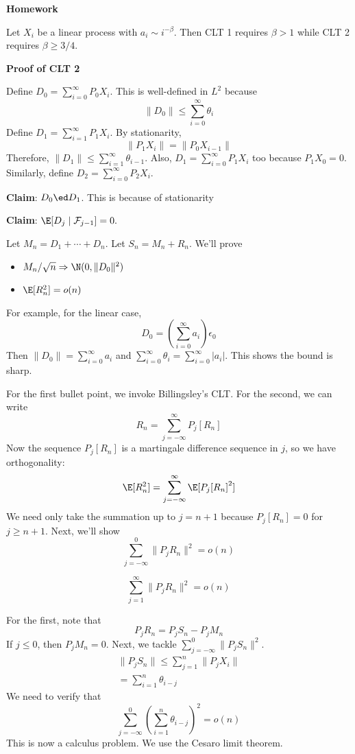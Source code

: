 \textbf{Homework}

Let \(X_i\) be a linear process with \(a_i \sim i^{-\beta}\). Then CLT 1 requires \(\beta > 1\) while CLT 2 requires \(\beta \geq 3/4\).

\textbf{Proof of CLT 2}

Define \(D_0 = \sum_{i=0}^\infty P_0 X_i\). This is well-defined in \(L^2\) because
\[\|D_0\| \leq \sum_{i=0}^\infty \theta_i\]
Define \(D_1 = \sum_{i=1}^\infty P_1 X_i\). By stationarity,
\[\|P_1 X_i\| = \|P_0 X_{i-1}\|\]
Therefore, \(\|D_1\| \leq \sum_{i=1}^\infty \theta_{i-1}\). Also, \(D_1 = \sum_{i=0}^\infty P_1 X_i\) too because \(P_1 X_0 = 0\). Similarly, define \(D_2 = \sum_{i=0}^\infty P_2 X_i\).

\textbf{Claim}: \(D_0 \ed D_1\). This is because of stationarity

\textbf{Claim}: \(\E[D_j \mid \mathcal{F}_{j-1}] = 0.\)

Let \(M_n = D_1 + \cdots + D_n\). Let \(S_n = M_n + R_n\). We'll prove

\begin{itemize}
\tightlist
\item
  \(M_n/\sqrt{n} \Rightarrow \N(0, \|D_0\|^2)\)
\item
  \(\E[R_n^2] = o(n)\)
\end{itemize}

For example, for the linear case,
\[D_0 = \left( \sum_{i=0}^\infty a_i \right) \epsilon_0\]
Then \(\|D_0\| = \sum_{i=0}^\infty a_i\) and \(\sum_{i=0}^\infty \theta_i = \sum_{i=0}^\infty |a_i|\). This shows the bound is sharp.

For the first bullet point, we invoke Billingsley's CLT. For the second, we can write
\[R_n = \sum_{j=-\infty}^\infty P_j[R_n]\]
Now the sequence \(P_j[R_n]\) is a martingale difference sequence in \(j\), so we have orthogonality:
\[\E[R_n^2] = \sum_{j=-\infty}^\infty \E[P_j[R_n]^2]\]
We need only take the summation up to \(j = n+1\) because \(P_j[R_n] = 0\) for \(j \geq n + 1\). Next, we'll show
\[\sum_{j=-\infty}^0 \|P_j R_n\|^2 = o(n)\]

\[\sum_{j=1}^\infty \|P_jR_n\|^2 = o(n)\]

For the first, note that
\[P_j R_n = P_j S_n - P_j M_n\]
If \(j \leq 0\), then \(P_j M_n = 0\). Next, we tackle \(\sum_{j=-\infty}^0 \|P_j S_n\|^2\).
\[\begin{gathered}\|P_j S_n\| \leq \sum_{j=1}^n \|P_j X_i\| \\
= \sum_{i=1}^n \theta_{i-j}\end{gathered}\]
We need to verify that
\[\sum_{j=-\infty}^0 \left( \sum_{i=1}^n \theta_{i-j} \right)^2 = o(n)\]
This is now a calculus problem. We use the Cesaro limit theorem.

